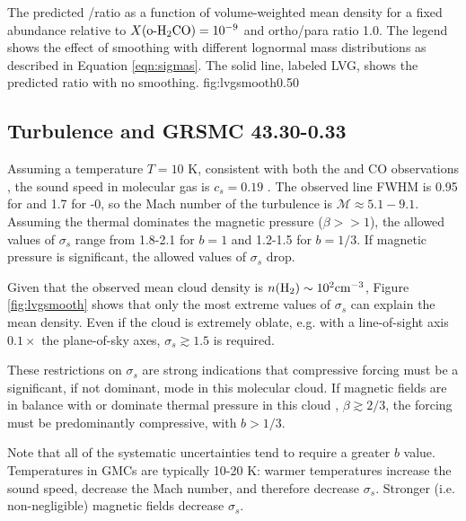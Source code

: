 {The predicted \formaldehyde \oneone/\twotwo ratio as a function of volume-weighted mean
density for a fixed abundance relative to \hh $X(\textrm{o-H}_2\textrm{CO}) = 10^{-9}$ and \hh
ortho/para ratio 1.0.  The legend shows the effect of smoothing with different
lognormal mass distributions as described in Equation \ref{eqn:sigmas}.%
The solid line, labeled LVG, shows the predicted ratio
with no smoothing.
}
{fig:lvgsmooth}{0.5}{0}

\subsection{Turbulence and GRSMC 43.30-0.33}
Assuming a temperature $T=10$ K, consistent with both the \formaldehyde and CO
observations \citep{Plume2004a}, the sound speed in molecular gas is $c_s=0.19$
\kms.  The observed line FWHM is 0.95 \kms for \formaldehyde and 1.7 \kms for
-0, so the Mach number of the turbulence is $\mathcal{M} \approx
5.1-9.1$.  Assuming the thermal dominates the magnetic pressure ($\beta>>1$),
the allowed values of $\sigma_s$ range from 1.8-2.1 for $b=1$ and 1.2-1.5 for
$b=1/3$.  If magnetic pressure is significant, the allowed values of $\sigma_s$
drop.

Given that the observed mean cloud density is $n(\textrm{H}_{2})\sim10^2 \textrm{cm}^{-3}$, Figure
\ref{fig:lvgsmooth} shows that only the most extreme values of $\sigma_s$ can
explain the mean density.  Even if the cloud is extremely oblate, e.g. with a
line-of-sight axis $0.1\times$ the plane-of-sky axes, $\sigma_s \gtrsim 1.5$ is
required.

These restrictions on $\sigma_s$ are strong indications that compressive
forcing must be a significant, if not dominant, mode in this molecular cloud.
If magnetic fields are in balance with or dominate thermal pressure in this
cloud , $\beta\gtrsim2/3$, the forcing must be predominantly
compressive, with $b>1/3$.

Note that all of the systematic uncertainties tend to require a greater $b$
value.  Temperatures in GMCs are typically 10-20 K: warmer temperatures
increase the sound speed, decrease the Mach number, and therefore decrease
$\sigma_s$.  Stronger (i.e. non-negligible) magnetic fields decrease
$\sigma_s$.

